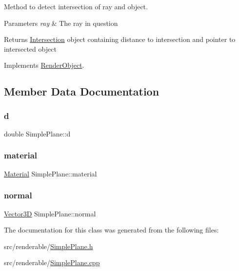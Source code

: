 Method to detect intersection of ray and object. 


\begin{DoxyParams}{Parameters}
{\em ray} & The ray in question \\
\hline
\end{DoxyParams}
\begin{DoxyReturn}{Returns}
\mbox{\hyperlink{classIntersection}{Intersection}} object containing distance to intersection and pointer to intersected object 
\end{DoxyReturn}


Implements \mbox{\hyperlink{classRenderObject_aa844ad2c5ef0c2b79faef2ed0af553bb}{Render\+Object}}.



\subsection{Member Data Documentation}
\mbox{\label{classSimplePlane_a84850a97b34a8616c7ffdd51c30a5dc9}} 
\subsubsection{\texorpdfstring{d}{d}}
{\footnotesize\ttfamily double Simple\+Plane\+::d\hspace{0.3cm}{\ttfamily [private]}}

\mbox{\label{classSimplePlane_a04307eae806daa2cd2f1c471224b44cf}} 
\subsubsection{\texorpdfstring{material}{material}}
{\footnotesize\ttfamily \mbox{\hyperlink{classMaterial}{Material}} Simple\+Plane\+::material\hspace{0.3cm}{\ttfamily [private]}}

\mbox{\label{classSimplePlane_a222f5d12aed966bc2764abc90b622037}} 
\subsubsection{\texorpdfstring{normal}{normal}}
{\footnotesize\ttfamily \mbox{\hyperlink{classVector3D}{Vector3D}} Simple\+Plane\+::normal\hspace{0.3cm}{\ttfamily [private]}}



The documentation for this class was generated from the following files\+:\begin{DoxyCompactItemize}
\item 
src/renderable/\mbox{\hyperlink{SimplePlane_8h}{Simple\+Plane.\+h}}\item 
src/renderable/\mbox{\hyperlink{SimplePlane_8cpp}{Simple\+Plane.\+cpp}}\end{DoxyCompactItemize}
